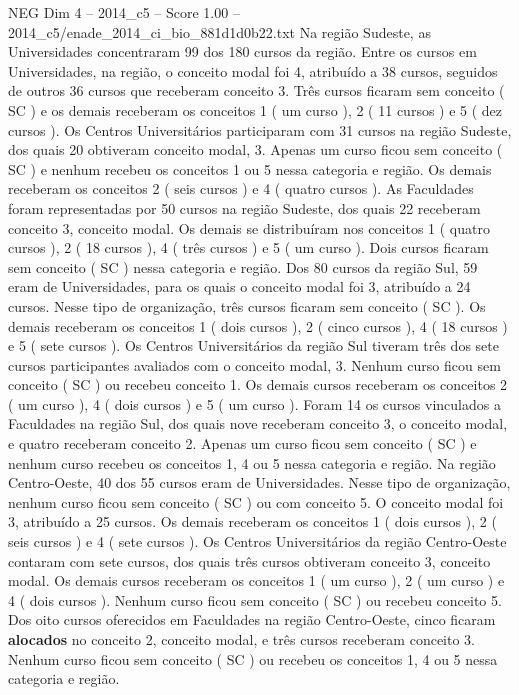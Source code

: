 \begin{textsample}{NEG Dim 4 – 2014\_c5 – Score 1.00 – 2014\_c5/enade\_2014\_ci\_bio\_881d1d0b22.txt}
Na região Sudeste, as Universidades concentraram 99 dos 180 cursos da região.
Entre os cursos em Universidades, na região, o conceito modal foi 4, atribuído a 38 cursos, seguidos de outros 36 cursos que receberam conceito 3.
Três cursos ficaram sem conceito ( SC ) e os demais receberam os conceitos 1 ( um curso ), 2 ( 11 cursos ) e 5 ( dez cursos ).
Os Centros Universitários participaram com 31 cursos na região Sudeste, dos quais 20 obtiveram conceito modal, 3.
Apenas um curso ficou sem conceito ( SC ) e nenhum recebeu os conceitos 1 ou 5 nessa categoria e região.
Os demais receberam os conceitos 2 ( seis cursos ) e 4 ( quatro cursos ).
As Faculdades foram representadas por 50 cursos na região Sudeste, dos quais 22 receberam conceito 3, conceito modal.
Os demais se distribuíram nos conceitos 1 ( quatro cursos ), 2 ( 18 cursos ), 4 ( três cursos ) e 5 ( um curso ).
Dois cursos ficaram sem conceito ( SC ) nessa categoria e região.
Dos 80 cursos da região Sul, 59 eram de Universidades, para os quais o conceito modal foi 3, atribuído a 24 cursos.
Nesse tipo de organização, três cursos ficaram sem conceito ( SC ).
Os demais receberam os conceitos 1 ( dois cursos ), 2 ( cinco cursos ), 4 ( 18 cursos ) e 5 ( sete cursos ).
Os Centros Universitários da região Sul tiveram três dos sete cursos participantes avaliados com o conceito modal, 3.
Nenhum curso ficou sem conceito ( SC ) ou recebeu conceito 1.
Os demais cursos receberam os conceitos 2 ( um curso ), 4 ( dois cursos ) e 5 ( um curso ).
Foram 14 os cursos vinculados a Faculdades na região Sul, dos quais nove receberam conceito 3, o conceito modal, e quatro receberam conceito 2.
Apenas um curso ficou sem conceito ( SC ) e nenhum curso recebeu os conceitos 1, 4 ou 5 nessa categoria e região.
Na região Centro-Oeste, 40 dos 55 cursos eram de Universidades.
Nesse tipo de organização, nenhum curso ficou sem conceito ( SC ) ou com conceito 5.
O conceito modal foi 3, atribuído a 25 cursos.
Os demais receberam os conceitos 1 ( dois cursos ), 2 ( seis cursos ) e 4 ( sete cursos ).
Os Centros Universitários da região Centro-Oeste contaram com sete cursos, dos quais três cursos obtiveram conceito 3, conceito modal.
Os demais cursos receberam os conceitos 1 ( um curso ), 2 ( um curso ) e 4 ( dois cursos ).
Nenhum curso ficou sem conceito ( SC ) ou recebeu conceito 5.
Dos oito cursos oferecidos em Faculdades na região Centro-Oeste, cinco ficaram \textbf{alocados} no conceito 2, conceito modal, e três cursos receberam conceito 3.
Nenhum curso ficou sem conceito ( SC ) ou recebeu os conceitos 1, 4 ou 5 nessa categoria e região.

\end{textsample}
